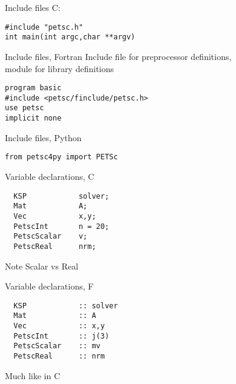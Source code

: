 

\begin{numberedframe}{Include files}
C:
\lstset{language=C}
\begin{lstlisting}
#include "petsc.h"
int main(int argc,char **argv)
\end{lstlisting}
\end{numberedframe}

\begin{fortran}
\lstset{language=Fortran}
\begin{numberedframe}{Include files, Fortran}
  Include file for preprocessor definitions,\\
  module for library definitions
\begin{lstlisting}
program basic
#include <petsc/finclude/petsc.h>
use petsc
implicit none
\end{lstlisting}
\end{numberedframe}
\end{fortran}

\begin{python}
\begin{numberedframe}{Include files, Python}
\lstset{language=Python}
\begin{lstlisting}
from petsc4py import PETSc
\end{lstlisting}
\end{numberedframe}
\end{python}

\lstset{language=C}
\begin{numberedframe}{Variable declarations, C}
\begin{lstlisting}
  KSP            solver;
  Mat            A;
  Vec            x,y;
  PetscInt       n = 20;
  PetscScalar    v;
  PetscReal      nrm;
\end{lstlisting}
Note Scalar vs Real
\end{numberedframe}

\lstset{language=Fortran}
\begin{fortran}
\begin{numberedframe}{Variable declarations, F}
\begin{lstlisting}
  KSP            :: solver
  Mat            :: A
  Vec            :: x,y
  PetscInt       :: j(3)
  PetscScalar    :: mv
  PetscReal      :: nrm
\end{lstlisting}
Much like in C
\end{numberedframe}
\end{fortran}

